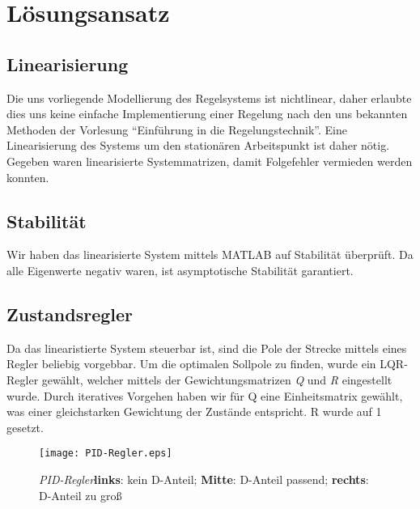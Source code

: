 \documentclass[pdf]{ifacconf}
\begin{document}
	
\section{Lösungsansatz}

	\subsection{Linearisierung}
	Die uns vorliegende Modellierung des Regelsystems ist nichtlinear, daher erlaubte dies uns keine einfache Implementierung einer Regelung nach den uns bekannten Methoden der Vorlesung ``Einführung in die Regelungstechnik''. 
	Eine Linearisierung des Systems um den stationären Arbeitspunkt ist daher nötig. Gegeben waren linearisierte Systemmatrizen, damit Folgefehler vermieden werden konnten. 
	
	\subsection{Stabilität}
	Wir haben das linearisierte System mittels MATLAB auf Stabilität überprüft. Da alle Eigenwerte negativ waren, ist asymptotische Stabilität garantiert.
	
	\subsection{Zustandsregler}
	Da das linearistierte System steuerbar ist, sind die Pole der Strecke mittels eines Regler 			beliebig vorgebbar. Um die optimalen Sollpole zu finden, wurde ein LQR-Regler gewählt, 				welcher mittels der Gewichtungsmatrizen \textit{Q} und \textit{R} eingestellt wurde.
	Durch iteratives Vorgehen haben wir für Q eine Einheitsmatrix gewählt, was einer   					gleichstarken Gewichtung der Zustände entspricht. R wurde auf 1 gesetzt.
	
\begin{figure}[h]	\centerline{\texttt{[image: PID-Regler.eps]}}
	\label{fig:theFig}
	\caption{\textit{PID-Regler}\newline \textbf{links}: kein D-Anteil; \textbf{Mitte}: D-Anteil passend; \textbf{rechts}: D-Anteil zu groß}
\end{figure}
\end{document}
